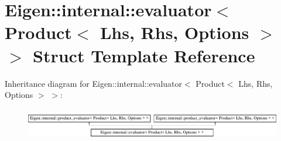 \hypertarget{struct_eigen_1_1internal_1_1evaluator_3_01_product_3_01_lhs_00_01_rhs_00_01_options_01_4_01_4}{}\section{Eigen\+:\+:internal\+:\+:evaluator$<$ Product$<$ Lhs, Rhs, Options $>$ $>$ Struct Template Reference}
\label{struct_eigen_1_1internal_1_1evaluator_3_01_product_3_01_lhs_00_01_rhs_00_01_options_01_4_01_4}
Inheritance diagram for Eigen\+:\+:internal\+:\+:evaluator$<$ Product$<$ Lhs, Rhs, Options $>$ $>$\+:\begin{figure}[H]
\begin{center}
\leavevmode
\includegraphics[height=1.389578cm]{struct_eigen_1_1internal_1_1evaluator_3_01_product_3_01_lhs_00_01_rhs_00_01_options_01_4_01_4}
\end{center}
\end{figure}
